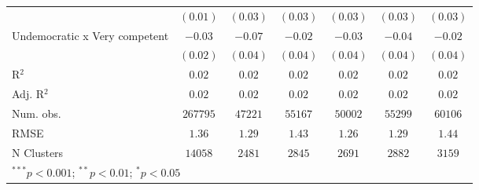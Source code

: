 \begin{table}[!htbp]
\begin{center}
\begin{tabular}{l c c c c c c}
                                & $(0.01)$      & $(0.03)$      & $(0.03)$      & $(0.03)$      & $(0.03)$      & $(0.03)$      \\
Undemocratic x Very competent   & $-0.03$       & $-0.07$       & $-0.02$       & $-0.03$       & $-0.04$       & $-0.02$       \\
                                & $(0.02)$      & $(0.04)$      & $(0.04)$      & $(0.04)$      & $(0.04)$      & $(0.04)$      \\
\hline
R$^2$                           & $0.02$        & $0.02$        & $0.02$        & $0.02$        & $0.02$        & $0.02$        \\
Adj. R$^2$                      & $0.02$        & $0.02$        & $0.02$        & $0.02$        & $0.02$        & $0.02$        \\
Num. obs.                       & $267795$      & $47221$       & $55167$       & $50002$       & $55299$       & $60106$       \\
RMSE                            & $1.36$        & $1.29$        & $1.43$        & $1.26$        & $1.29$        & $1.44$        \\
N Clusters                      & $14058$       & $2481$        & $2845$        & $2691$        & $2882$        & $3159$        \\
\hline
\multicolumn{7}{l}{\scriptsize{$^{***}p<0.001$; $^{**}p<0.01$; $^{*}p<0.05$}}
\end{tabular}
\label{table_a2}
\end{center}
\end{table}
